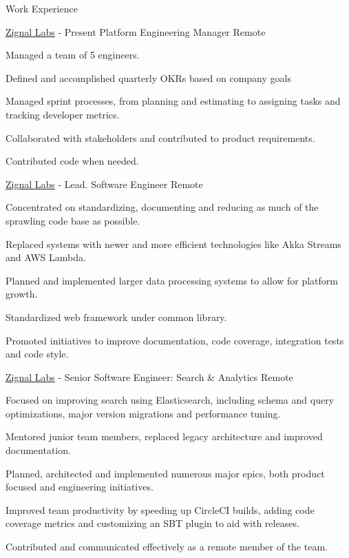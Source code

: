 \documentclass[UKenglish]{resume} %
\begin{document}
\begin{rSection}{Work Experience}
    \begin{rSubsection}
        {\href{https://www.zignallabs.com}{Zignal Labs}}
        {  - Present }
        {Platform Engineering Manager}
        {Remote}

        \item Managed a team of 5 engineers.
        \item Defined and accomplished quarterly OKRs based on company goals
        \item Managed sprint processes, from planning and estimating to assigning tasks and tracking developer metrics.
        \item Collaborated with stakeholders and contributed to product requirements.
        \item Contributed code when needed.

    \end{rSubsection}

    \begin{rSubsection}
        {\href{https://www.zignallabs.com}{Zignal Labs}}
        {  -  }
        {Lead. Software Engineer}
        {Remote}

        \item Concentrated on standardizing, documenting and reducing as much of the sprawling code base as possible.
        \item Replaced systems with newer and more efficient technologies like Akka Streams and AWS Lambda.
        \item Planned and implemented larger data processing systems to allow for platform growth.
        \item Standardized web framework under common library.
        \item Promoted initiatives to improve documentation, code coverage, integration tests and code style.
    \end{rSubsection}

    \begin{rSubsection}
        {\href{https://www.zignallabs.com}{Zignal Labs}}
        {  -  }
        {Senior Software Engineer: Search \& Analytics }
        {Remote}
        \item Focused on improving search using Elasticsearch, including schema and query optimizations, major version migrations and performance tuning.
        \item Mentored junior team members, replaced legacy architecture and improved documentation.
        \item Planned, architected and implemented numerous major epics, both product focused and engineering initiatives.
        \item Improved team productivity by speeding up CircleCI builds, adding code coverage metrics and customizing an SBT plugin to aid with releases.
        \item Contributed and communicated effectively as a remote member of the team.
    \end{rSubsection}


\end{rSection}
\end{document}
